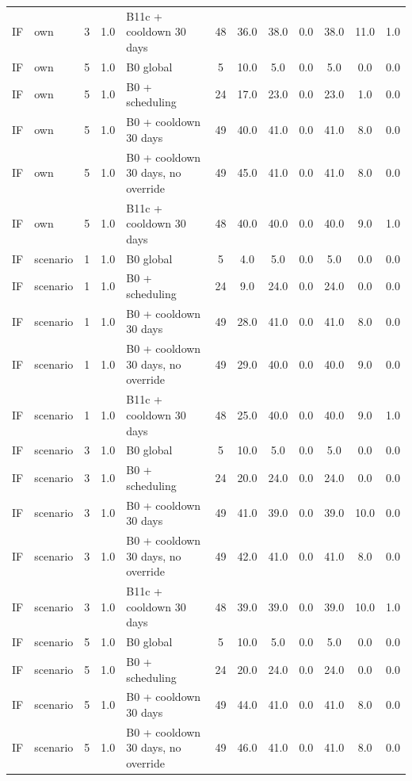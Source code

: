 \begin{longtable}{lllllccccccc}
IF & own & 3 & 1.0 & B11c + cooldown 30 days & 48 & 36.0 & 38.0 & 0.0 & 38.0 & 11.0 & 1.0 \\
IF & own & 5 & 1.0 & B0 global & 5 & 10.0 & 5.0 & 0.0 & 5.0 & 0.0 & 0.0 \\
IF & own & 5 & 1.0 & B0 + scheduling & 24 & 17.0 & 23.0 & 0.0 & 23.0 & 1.0 & 0.0 \\
IF & own & 5 & 1.0 & B0 + cooldown 30 days & 49 & 40.0 & 41.0 & 0.0 & 41.0 & 8.0 & 0.0 \\
IF & own & 5 & 1.0 & B0 + cooldown 30 days, no override & 49 & 45.0 & 41.0 & 0.0 & 41.0 & 8.0 & 0.0 \\
IF & own & 5 & 1.0 & B11c + cooldown 30 days & 48 & 40.0 & 40.0 & 0.0 & 40.0 & 9.0 & 1.0 \\
IF & scenario & 1 & 1.0 & B0 global & 5 & 4.0 & 5.0 & 0.0 & 5.0 & 0.0 & 0.0 \\
IF & scenario & 1 & 1.0 & B0 + scheduling & 24 & 9.0 & 24.0 & 0.0 & 24.0 & 0.0 & 0.0 \\
IF & scenario & 1 & 1.0 & B0 + cooldown 30 days & 49 & 28.0 & 41.0 & 0.0 & 41.0 & 8.0 & 0.0 \\
IF & scenario & 1 & 1.0 & B0 + cooldown 30 days, no override & 49 & 29.0 & 40.0 & 0.0 & 40.0 & 9.0 & 0.0 \\
IF & scenario & 1 & 1.0 & B11c + cooldown 30 days & 48 & 25.0 & 40.0 & 0.0 & 40.0 & 9.0 & 1.0 \\
IF & scenario & 3 & 1.0 & B0 global & 5 & 10.0 & 5.0 & 0.0 & 5.0 & 0.0 & 0.0 \\
IF & scenario & 3 & 1.0 & B0 + scheduling & 24 & 20.0 & 24.0 & 0.0 & 24.0 & 0.0 & 0.0 \\
IF & scenario & 3 & 1.0 & B0 + cooldown 30 days & 49 & 41.0 & 39.0 & 0.0 & 39.0 & 10.0 & 0.0 \\
IF & scenario & 3 & 1.0 & B0 + cooldown 30 days, no override & 49 & 42.0 & 41.0 & 0.0 & 41.0 & 8.0 & 0.0 \\
IF & scenario & 3 & 1.0 & B11c + cooldown 30 days & 48 & 39.0 & 39.0 & 0.0 & 39.0 & 10.0 & 1.0 \\
IF & scenario & 5 & 1.0 & B0 global & 5 & 10.0 & 5.0 & 0.0 & 5.0 & 0.0 & 0.0 \\
IF & scenario & 5 & 1.0 & B0 + scheduling & 24 & 20.0 & 24.0 & 0.0 & 24.0 & 0.0 & 0.0 \\
IF & scenario & 5 & 1.0 & B0 + cooldown 30 days & 49 & 44.0 & 41.0 & 0.0 & 41.0 & 8.0 & 0.0 \\
IF & scenario & 5 & 1.0 & B0 + cooldown 30 days, no override & 49 & 46.0 & 41.0 & 0.0 & 41.0 & 8.0 & 0.0 \\

\end{longtable}
